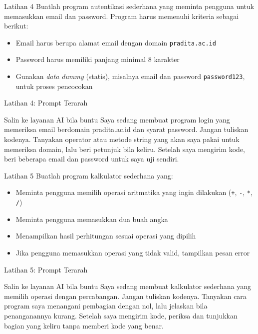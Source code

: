 \documentclass[aspectratio=169, table]{beamer}
\begin{document}
\begin{frame}[fragile,allowframebreaks=0.8]{Latihan 4}
\footnotesize
Buatlah program autentikasi sederhana yang meminta pengguna untuk memasukkan email dan password. Program harus memenuhi kriteria sebagai berikut:
\begin{itemize}
    \item Email harus berupa alamat email dengan domain \texttt{pradita.ac.id}
    \item Password harus memiliki panjang minimal 8 karakter
    \item Gunakan \textit{data dummy} (statis), misalnya email  dan password \texttt{password123}, untuk proses pencocokan
\end{itemize}
\end{frame}

\begin{frame}{Latihan 4: Prompt Terarah}
\begin{block}{Salin ke layanan AI bila buntu}
\small Saya sedang membuat program login yang memeriksa email berdomain pradita.ac.id dan syarat password. Jangan tuliskan kodenya. Tanyakan operator atau metode string yang akan saya pakai untuk memeriksa domain, lalu beri petunjuk bila keliru. Setelah saya mengirim kode, beri beberapa email dan password untuk saya uji sendiri.
\end{block}
\end{frame}

\begin{frame}[fragile,allowframebreaks=0.8]{Latihan 5}
\footnotesize
Buatlah program kalkulator sederhana yang:
\begin{itemize}
    \item Meminta pengguna memilih operasi aritmatika yang ingin dilakukan (\texttt{+}, \texttt{-}, \texttt{*}, \texttt{/})
    \item Meminta pengguna memasukkan dua buah angka
    \item Menampilkan hasil perhitungan sesuai operasi yang dipilih
    \item Jika pengguna memasukkan operasi yang tidak valid, tampilkan pesan error
\end{itemize}
\end{frame}

\begin{frame}{Latihan 5: Prompt Terarah}
\begin{block}{Salin ke layanan AI bila buntu}
\small Saya sedang membuat kalkulator sederhana yang memilih operasi dengan percabangan. Jangan tuliskan kodenya. Tanyakan cara program saya menangani pembagian dengan nol, lalu jelaskan bila penanganannya kurang. Setelah saya mengirim kode, periksa dan tunjukkan bagian yang keliru tanpa memberi kode yang benar.
\end{block}
\end{frame}
\end{document}
